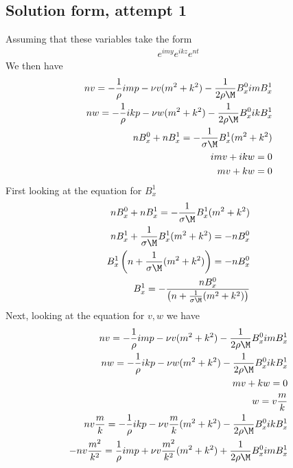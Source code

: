 \documentclass[11pt]{article}
\begin{document}
\subsection{Solution form, attempt 1}
Assuming that these variables take the form
\begin{equation}\begin{aligned}
e^{imy} e^{ikz} e^{nt}
\end{aligned} \end{equation}
We then have
\begin{equation}\begin{aligned}
n v = -\frac{1}{\rho} im p - \nu v (m^2+k^2) - \frac{1}{2\rho \M} B_x^0 im B_x^1 \\
n w = -\frac{1}{\rho} ik p - \nu w (m^2+k^2) - \frac{1}{2\rho \M} B_x^0 ik B_x^1 \\
n B_x^0+ n B_x^1 = - \frac{1}{\sigma \M} B_x^1 (m^2 +k^2 ) \\
im v + ik w = 0 \\
m v + k w = 0 \\
\end{aligned} \end{equation}
First looking at the equation for $B_x^1$
\begin{equation}\begin{aligned}
n B_x^0+ n B_x^1 = - \frac{1}{\sigma \M} B_x^1 (m^2 +k^2 ) \\
n B_x^1 + \frac{1}{\sigma \M} B_x^1 (m^2 +k^2 ) = - n B_x^0 \\
B_x^1 \left( n + \frac{1}{\sigma \M} (m^2 +k^2 ) \right) = - n B_x^0 \\
B_x^1 = - \frac{n B_x^0}{\left( n + \frac{1}{\sigma \M} (m^2 +k^2 ) \right)} \\
\end{aligned} \end{equation}
Next, looking at the equation for $v,w$ we have
\begin{equation}\begin{aligned}
n v = -\frac{1}{\rho} im p - \nu v (m^2+k^2) - \frac{1}{2\rho \M} B_x^0 im B_x^1 \\
n w = -\frac{1}{\rho} ik p - \nu w (m^2+k^2) - \frac{1}{2\rho \M} B_x^0 ik B_x^1 \\
m v + k w = 0 \\
w = v \frac{m}{k} \\
  n v \frac{m}{k}     = -\frac{1}{\rho} ik p - \nu v \frac{m}{k} (m^2+k^2)     - \frac{1}{2\rho \M} B_x^0 ik B_x^1 \\
- n v \frac{m^2}{k^2} = \frac{1}{\rho} im p  + \nu v \frac{m^2}{k^2} (m^2+k^2) + \frac{1}{2\rho \M} B_x^0 im B_x^1 \\
\end{aligned} \end{equation}
\end{document}
